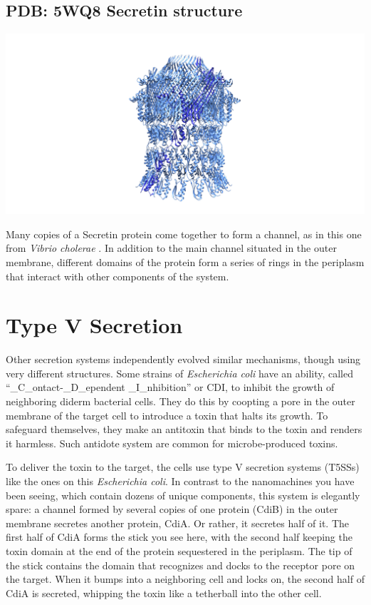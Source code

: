 \documentclass[]{tufte-book}
\begin{document}
\subsection{PDB: 5WQ8 Secretin
structure}\label{PDB:_5WQ8_Secretin_structure}

\includegraphics{img/schematics/9_4_2}

Many copies of a Secretin protein come together to form a channel, as in
this one from \emph{Vibrio cholerae} \citet{yan2017a}. In addition to
the main channel situated in the outer membrane, different domains of
the protein form a series of rings in the periplasm that interact with
other components of the system.

\section{Type V Secretion}\label{type-v-secretion}

Other secretion systems independently evolved similar mechanisms, though
using very different structures. Some strains of \emph{Escherichia coli}
have an ability, called ``\_C\_ontact-\_D\_ependent \_I\_nhibition'' or
CDI, to inhibit the growth of neighboring diderm bacterial cells. They
do this by coopting a pore in the outer membrane of the target cell to
introduce a toxin that halts its growth. To safeguard themselves, they
make an antitoxin that binds to the toxin and renders it harmless. Such
antidote system are common for microbe-produced toxins.

To deliver the toxin to the target, the cells use type V secretion
systems (T5SSs) like the ones on this \emph{Escherichia coli}. In
contrast to the nanomachines you have been seeing, which contain dozens
of unique components, this system is elegantly spare: a channel formed
by several copies of one protein (CdiB) in the outer membrane secretes
another protein, CdiA. Or rather, it secretes half of it. The first half
of CdiA forms the stick you see here, with the second half keeping the
toxin domain at the end of the protein sequestered in the periplasm. The
tip of the stick contains the domain that recognizes and docks to the
receptor pore on the target. When it bumps into a neighboring cell and
locks on, the second half of CdiA is secreted, whipping the toxin like a
tetherball into the other cell.
\end{document}
